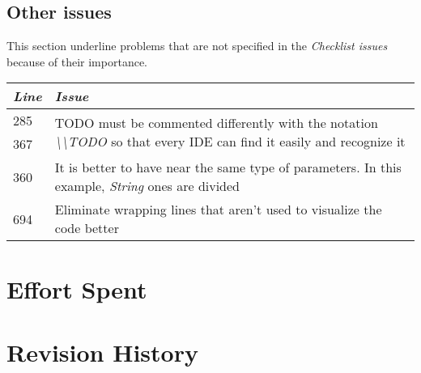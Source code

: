 \documentclass[11pt,a4paper]{report}
\begin{document}
\section{Other issues}
This section underline problems that are not specified in the \textit{Checklist issues} because of their importance.
\begin{tabularx}{\textwidth}{|l|X|}
	\hline
	\textit{Line} & \textit{Issue}\\
	\hline
	285 & \multirow{2}{*}{TODO must be commented differently with the notation \textit{\textbackslash\textbackslash TODO} so that every IDE can find it easily and recognize it}\\
	367 & \\
	\hline
	360 & It is better to have near the same type of parameters. In this example, \textit{String} ones are divided\\
	\hline
	694 & Eliminate wrapping lines that aren't used to visualize the code better\\
	\hline
\end{tabularx}
\chapter{Effort Spent}
\chapter{Revision History}
\end{document}
